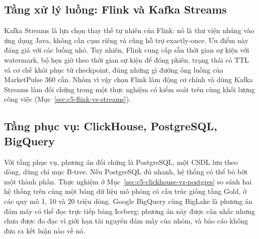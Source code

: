 \subsection{Tầng xử lý luồng: Flink và Kafka Streams}
\label{sec:c2-alt-streaming}

Kafka Streams là lựa chọn thay thế tự nhiên của Flink: nó là thư viện nhúng vào ứng dụng Java, không cần cụm riêng và cũng hỗ trợ exactly-once. Ưu điểm này đáng giá với các luồng nhỏ. Tuy nhiên, Flink cung cấp sẵn thời gian sự kiện với watermark, bộ hẹn giờ theo thời gian sự kiện để đóng phiên, trạng thái có TTL và cơ chế khôi phục từ checkpoint, đúng những gì đường ống luồng của MarketPulse 360 cần. Nhóm vì vậy chọn Flink làm động cơ chính và dùng Kafka Streams làm đối chứng trong một thực nghiệm có kiểm soát trên cùng khối lượng công việc (Mục~\ref{sec:c5-flink-vs-streams}).

\subsection{Tầng phục vụ: ClickHouse, PostgreSQL, BigQuery}
\label{sec:c2-alt-serving}

Với tầng phục vụ, phương án đối chứng là PostgreSQL, một CSDL lưu theo dòng, dùng chỉ mục B-tree. Nếu PostgreSQL đủ nhanh, hệ thống có thể bỏ bớt một thành phần. Thực nghiệm ở Mục~\ref{sec:c5-clickhouse-vs-postgres} so sánh hai hệ thống trên cùng một bảng dữ liệu mô phỏng có cấu trúc giống tầng Gold, ở các quy mô 1, 10 và 20 triệu dòng. Google BigQuery cùng BigLake là phương án đám mây có thể đọc trực tiếp bảng Iceberg; phương án này được cân nhắc nhưng chưa được đo đạc vì giới hạn tài nguyên đám mây của nhóm, và báo cáo không đưa ra kết luận nào về nó.

